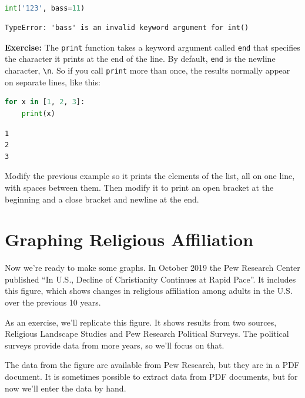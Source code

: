 \begin{lstlisting}[language=Python,style=source]
%%expect TypeError

int('123', bass=11)
\end{lstlisting}

\begin{lstlisting}[style=output]
TypeError: 'bass' is an invalid keyword argument for int()
\end{lstlisting}

\textbf{Exercise:} The \passthrough{\lstinline!print!} function takes a
keyword argument called \passthrough{\lstinline!end!} that specifies the
character it prints at the end of the line. By default,
\passthrough{\lstinline!end!} is the newline character,
\passthrough{\lstinline!\\n!}. So if you call
\passthrough{\lstinline!print!} more than once, the results normally
appear on separate lines, like this:

\begin{lstlisting}[language=Python,style=source]
for x in [1, 2, 3]:
    print(x)
\end{lstlisting}

\begin{lstlisting}[style=output]
1
2
3
\end{lstlisting}

Modify the previous example so it prints the elements of the list, all
on one line, with spaces between them. Then modify it to print an open
bracket at the beginning and a close bracket and newline at the end.

\hypertarget{graphing-religious-affiliation}{%
\section{Graphing Religious
Affiliation}\label{graphing-religious-affiliation}}

Now we're ready to make some graphs. In October 2019 the Pew Research
Center published ``In U.S., Decline of Christianity Continues at Rapid
Pace''. It includes this figure, which shows changes in religious
affiliation among adults in the U.S. over the previous 10 years.

As an exercise, we'll replicate this figure. It shows results from two
sources, Religious Landscape Studies and Pew Research Political Surveys.
The political surveys provide data from more years, so we'll focus on
that.

The data from the figure are available from Pew Research, but they are
in a PDF document. It is sometimes possible to extract data from PDF
documents, but for now we'll enter the data by hand.

